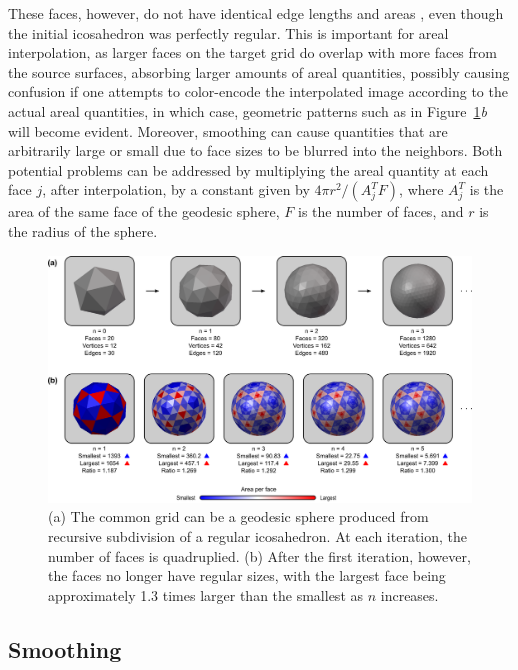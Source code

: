 These faces, however, do not have identical edge lengths and areas \citep{Kenner1976}, even though the initial icosahedron was perfectly regular. This is important for areal interpolation, as larger faces on the target grid do overlap with more faces from the source surfaces, absorbing larger amounts of areal quantities, possibly causing confusion if one attempts to color-encode the interpolated image according to the actual areal quantities, in which case, geometric patterns such as in Figure~\ref{fig:geosphere}\emph{b} will become evident. Moreover, smoothing can cause quantities that are arbitrarily large or small due to face sizes to be blurred into the neighbors. Both potential problems can be addressed by multiplying the areal quantity at each face $j$, after interpolation, by a constant given by $4 \pi r^2/(A^{T}_{j}F)$, where $A^{T}_{j}$ is the area of the same face of the geodesic sphere, $F$ is the number of faces, and $r$ is the radius of the sphere.

\begin{figure}[!t]  %
\centering
\includegraphics[width=14cm]{images/geosphere.png}
\caption[Geodesic spheres.]{(a) The common grid can be a geodesic sphere produced from recursive subdivision of a regular icosahedron. At each iteration, the number of faces is quadruplied. (b) After the first iteration, however, the faces no longer have regular sizes, with the largest face being approximately 1.3 times larger than the smallest as $n$ increases.}
\label{fig:geosphere}
\end{figure}

\subsection{Smoothing}
\label{sec:smoothing}

